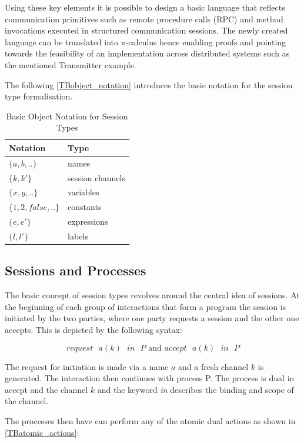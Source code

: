 Using these key elements it is possible to design a basic language that reflects communication primitives such as remote procedure calls (RPC) and method invocations executed in structured communication sessions. The newly created language can be translated into $\pi$-calculus hence enabling proofs and pointing towards the feasibility of an implementation across distributed systems such as the mentioned Transmitter example.

The following \autoref{TBobject_notation} introduces the basic notation for the session type formalisation.

\begin{table}[H]
\center
\caption{Basic Object Notation for Session Types}
\begin{tabular}{|l|l|}
  \hline
  Notation & Type \\
  \hline
  $\{a,b,..\}$ & names \\
  $\{k,k'\}$ & session channels \\
  $\{x,y,..\}$ & variables \\
  $\{1,2,false,..\}$ & constants \\
  $\{e,e'\}$ & expressions \\
  $\{l,l'\}$ & labels \\
  \hline
\end{tabular}
\label{TBobject_notation}
\end{table}

\subsection{Sessions and Processes}
The basic concept of session types revolves around the central idea of sessions. At the beginning of each group of interactions that form a program the session is initiated by the two parties, where one party requests a session and the other one accepts. This is depicted by the following syntax:

\[request\mbox{ }a(k)\mbox{ }in\mbox{ }P\mbox{ and }accept\mbox{ }a(k)\mbox{ }in\mbox{ }P\]

The request for initiation is made via a name $a$ and a fresh channel $k$ is generated. The interaction then continues with process P. The process is dual in accept and the channel $k$ and the keyword \textit{in} describes the binding and scope of the channel.

The processes then have can perform any of the atomic dual actions as shown in \autoref{TBatomic_actions}:

